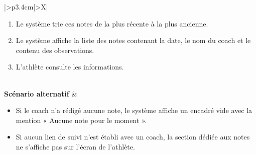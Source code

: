 ﻿\documentclass[a4paper,12pt]{report}
\begin{document}
\begin{table}[H]
\begin{tabularx}{\textwidth}{|>{\RaggedRight\arraybackslash}p{3.4cm}|>{\RaggedRight\arraybackslash}X|}
\begin{minipage}[t]{\linewidth}
\begin{enumerate}[label=\arabic*., leftmargin=*, topsep=0pt, itemsep=1pt]
    \item Le système trie ces notes de la plus récente à la plus ancienne.
    \item Le système affiche la liste des notes contenant la date, le nom du coach et le contenu des observations.
    \item L'athlète consulte les informations.
\end{enumerate}
\vspace{2pt}
\end{minipage} \\
\hline
\textbf{Scénario alternatif} &
\begin{minipage}[t]{\linewidth}\sloppy
\vspace{2pt}
\begin{itemize}[leftmargin=*, topsep=0pt, itemsep=1pt]
    \item  Si le coach n'a rédigé aucune note, le système affiche un encadré vide avec la mention « Aucune note pour le moment ».
    \item  Si aucun lien de suivi n'est établi avec un coach, la section dédiée aux notes ne s'affiche pas sur l'écran de l'athlète.
\end{itemize}
\vspace{2pt}
\end{minipage} \\
\hline
\end{tabularx}
\fussy
\end{table}
\endgroup
\end{document}
